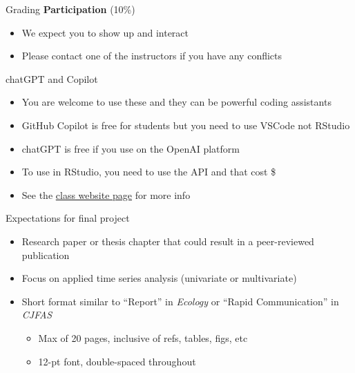 \documentclass[
  ignorenonframetext,
]{beamer}
\providecommand{\tightlist}{%
  \setlength{\itemsep}{0pt}\setlength{\parskip}{0pt}}
\begin{document}
\begin{frame}{Grading}
\label{grading-2}
\textbf{Participation} (10\%)

\begin{itemize}
\item
  We expect you to show up and interact
\item
  Please contact one of the instructors if you have any conflicts
\end{itemize}
\end{frame}

\begin{frame}{chatGPT and Copilot}
\label{chatgpt-and-copilot}
\begin{itemize}
\tightlist
\item
  You are welcome to use these and they can be powerful coding
  assistants
\item
  GitHub Copilot is free for students but you need to use VSCode not
  RStudio
\item
  chatGPT is free if you use on the OpenAI platform
\item
  To use in RStudio, you need to use the API and that cost \$
\item
  See the
  \href{https://atsa-es.github.io/atsa/syllabus.html\#chatGPT_and_co-pilot}{class
  website page} for more info
\end{itemize}
\end{frame}

\begin{frame}{Expectations for final project}
\label{expectations-for-final-project}
\begin{itemize}
\item
  Research paper or thesis chapter that could result in a peer-reviewed
  publication
\item
  Focus on applied time series analysis (univariate or multivariate)
\item
  Short format similar to ``Report'' in \emph{Ecology} or ``Rapid
  Communication'' in \emph{CJFAS}

  \begin{itemize}
  \tightlist
  \item
    Max of 20 pages, inclusive of refs, tables, figs, etc
  \item
    12-pt font, double-spaced throughout
  \end{itemize}
\end{itemize}
\end{frame}
\end{document}
